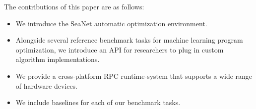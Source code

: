 The contributions of this paper are as follows:
\begin{itemize}
\setlength\itemsep{0em}
\item We introduce the SeaNet automatic optimization environment.
\item Alongside several reference benchmark tasks for machine learning program optimization, we introduce an API for researchers to plug in custom algorithm implementations.
\item We provide a cross-platform RPC runtime-system that supports a wide range of hardware devices.
\item We include baselines for each of our benchmark tasks.
\end{itemize}


